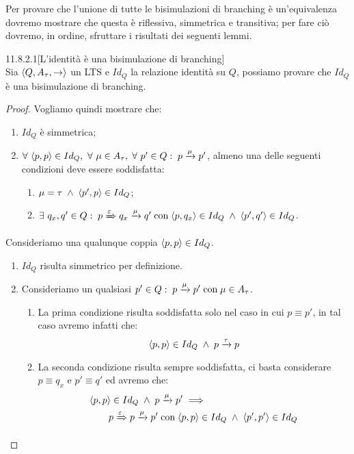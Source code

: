 Per provare che l'unione di tutte le bisimulazioni di branching è un'equivalenza dovremo mostrare che questa è riflessiva, simmetrica e transitiva; per fare ciò dovremo, in ordine, sfruttare i risultati dei seguenti lemmi.
\begin{customlemma}{11.8.2.1}[L'identità è una bisimulazione di branching]
\label{lemma:11.8.2.1} \hfill \\
Sia $\langle Q, A_{\tau}, \rightarrow \rangle$ un LTS e $Id_Q$ la relazione identità su $Q$, possiamo provare che $Id_Q$ è una bisimulazione di branching.
\end{customlemma}
\begin{proof}
Vogliamo quindi mostrare che:
\begin{enumerate}
\item $Id_Q$ è simmetrica;
\item $\forall\ \tupla{p,p} \in Id_Q,\ \forall\ \mu \in A_{\tau} \valeche
\forall\ p' \in Q \tc p \xrightarrow{\mu} p'$, almeno una delle seguenti condizioni deve essere soddisfatta:
\begin{enumerate}
\item $\mu = \tau \; \land \; \langle p', p \rangle \in Id_Q$;
\item $\exists\ q_x, q' \in Q :\; p \xRightarrow{\varepsilon} q_x \xrightarrow{\mu} q' 
	\; \text{con} \; \langle p, q_x \rangle \in Id_Q 
	\; \land \; \langle p', q' \rangle \in Id_Q$.
\end{enumerate}
\end{enumerate}
Consideriamo una qualunque coppia $\langle p,p \rangle \in Id_Q$.
\begin{enumerate}[leftmargin=*]
\item $Id_Q$ risulta simmetrico per definizione.
\item Consideriamo un qualsiasi $p' \in Q :\; p \xrightarrow{\mu} p' \; \text{con} \; \mu \in A_{\tau}$.
\begin{enumerate}
\item La prima condizione risulta soddisfatta solo nel caso in cui $p \equiv p'$, in tal caso avremo infatti che: \[
	\langle p,p \rangle \in Id_Q \; \land \; p \xrightarrow{\tau} p
\]
\item La seconda condizione risulta sempre soddisfatta, ci basta considerare $p \equiv q_x$ e $p' \equiv q'$ ed avremo che:
\begin{align*}
	&\langle p,p \rangle \in Id_Q \; \land \; p \xrightarrow{\mu} p' \implies \\
	&\hspace{2em} p \xRightarrow{\varepsilon} p \xrightarrow{\mu} p' 
	\; \text{con} \; \langle p, p \rangle \in Id_Q \; \land \; \langle p', p' \rangle \in Id_Q
\end{align*}
\end{enumerate}
\end{enumerate}
\end{proof}

